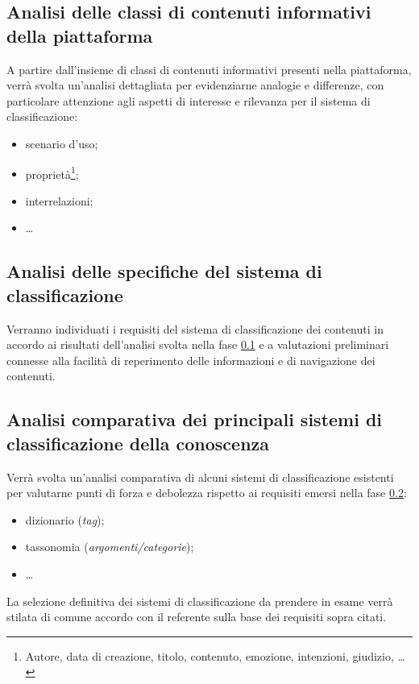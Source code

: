 \documentclass[10pt,a4paper,hidelinks]{scrartcl} %
\begin{document}
	\subsection{Analisi delle classi di contenuti informativi della piattaforma}
	\label{sec:stage:wp:analisi-contenuti}
	A partire dall'insieme di classi di contenuti informativi presenti nella piattaforma, verrà svolta un'analisi dettagliata per evidenziarne analogie e differenze, con particolare attenzione agli aspetti di interesse e rilevanza per il sistema di classificazione:
	\begin{itemize}
		\item scenario d'uso;
		\item proprietà\footnote{Autore, data di creazione, titolo, contenuto, emozione, intenzioni, giudizio, \ldots};
		\item interrelazioni;
		\item \ldots
	\end{itemize}

	\subsection{Analisi delle specifiche del sistema di classificazione}
	\label{sec:stage:wp:ar}
	Verranno individuati i requisiti del sistema di classificazione dei contenuti in accordo ai risultati dell'analisi svolta nella fase \ref{sec:stage:wp:analisi-contenuti} e a valutazioni preliminari connesse alla facilità di reperimento delle informazioni e di navigazione dei contenuti.

	\subsection{Analisi comparativa dei principali sistemi di classificazione della conoscenza}
	\label{sec:stage:wp:ac}
	Verrà svolta un'analisi comparativa di alcuni sistemi di classificazione esistenti per valutarne punti di forza e debolezza rispetto ai requisiti emersi nella fase \ref{sec:stage:wp:ar}:
	\begin{itemize}
		\item dizionario (\emph{tag});
		\item tassonomia (\emph{argomenti/categorie});
		\item \ldots
	\end{itemize}
	La selezione definitiva dei sistemi di classificazione da prendere in esame verrà stilata di comune accordo con il referente sulla base dei requisiti sopra citati.
\end{document}
